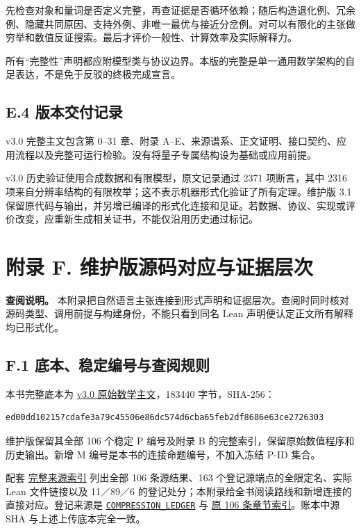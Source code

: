 \documentclass[
  11pt,
  oneside]{book}
\begin{document}
先检查对象和量词是否定义完整，再查证据是否循环依赖；随后构造退化例、冗余例、隐藏共同原因、支持外例、非唯一最优与接近分岔例。对可以有限化的主张做穷举和数值反证搜索。最后才评价一般性、计算效率及实际解释力。

所有``完整性''声明都应附模型类与协议边界。本版的完整是单一通用数学架构的自足表达，不是免于反驳的终极完成宣言。

\section{E.4 版本交付记录}\label{e.4-ux7248ux672cux4ea4ux4ed8ux8bb0ux5f55}

v3.0 完整主文包含第 0--31 章、附录 A--E、来源谱系、正文证明、接口契约、应用流程以及完整可运行检验。没有将量子专属结构设为基础或应用前提。

v3.0 历史验证使用合成数据和有限模型，原文记录通过 2371 项断言，其中 2316 项来自分辨率结构的有限枚举；这不表示机器形式化验证了所有定理。维护版 3.1 保留原代码与输出，并另增已编译的形式化连接和见证。若数据、协议、实现或评价改变，应重新生成相关证书，不能仅沿用历史通过标记。

\chapter{附录 F. 维护版源码对应与证据层次}\label{appendix-f}

\textbf{查阅说明。} 本附录把自然语言主张连接到形式声明和证据层次。查阅时同时核对源码类型、调用前提与构建身份，不能只看到同名 Lean 声明便认定正文所有解释均已形式化。

\section{F.1 底本、稳定编号与查阅规则}\label{f.1-ux5e95ux672cux7a33ux5b9aux7f16ux53f7ux4e0eux67e5ux9605ux89c4ux5219}

本书完整底本为 \href{source/core-v3.0/UEOT_Core_Mathematics_v3.0_Complete.md}{v3.0 原始数学主文}，183440 字节，SHA-256：

\begin{verbatim}
ed00dd102157cdafe3a79c45506e86dc574d6cba65feb2df8686e63ce2726303
\end{verbatim}

维护版保留其全部 106 个稳定 P 编号及附录 B 的完整索引，保留原始数值程序和历史输出。新增 M 编号是本书的连接命题编号，不加入冻结 P-ID 集合。

配套 \href{UEOT_MATHEMATICS_SOURCES.md}{完整来源索引} 列出全部 106 条源结果、163 个登记源端点的全限定名、实际 Lean 文件链接以及 11／89／6 的登记处分；本附录给全书阅读路线和新增连接的直接对应。登记来源是 \href{../formalization/ueot-core/docs/compression/COMPRESSION_LEDGER.yaml}{\nolinkurl{COMPRESSION_LEDGER}} 与 \href{../formalization/ueot-core/docs/CORE_COMPRESSION_THEOREM_INDEX.csv}{原 106 条章节索引}。账本中源 SHA 与上述上传底本完全一致。
\end{document}
